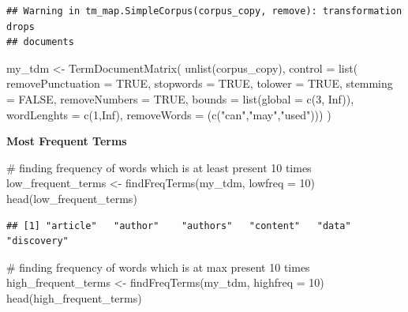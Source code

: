 \documentclass[
]{article}
\newenvironment{Shaded}{}{}
\newcommand{\AttributeTok}[1]{#1}
\newcommand{\CommentTok}[1]{\textcolor[rgb]{0.30,0.53,0.42}{#1}}
\newcommand{\ConstantTok}[1]{\textcolor[rgb]{0.35,0.36,0.96}{#1}}
\newcommand{\DecValTok}[1]{\textcolor[rgb]{0.00,0.00,0.80}{#1}}
\newcommand{\FunctionTok}[1]{#1}
\newcommand{\NormalTok}[1]{#1}
\newcommand{\OtherTok}[1]{\textcolor[rgb]{1.00,0.25,0.00}{#1}}
\newcommand{\StringTok}[1]{\textcolor[rgb]{0.01,0.42,0.03}{#1}}
\begin{document}
\begin{verbatim}
## Warning in tm_map.SimpleCorpus(corpus_copy, remove): transformation drops
## documents
\end{verbatim}

\begin{Shaded}
\begin{Highlighting}[]
\NormalTok{my\_tdm }\OtherTok{\textless{}{-}} \FunctionTok{TermDocumentMatrix}\NormalTok{(}
  \FunctionTok{unlist}\NormalTok{(corpus\_copy),}
  \AttributeTok{control =}
    \FunctionTok{list}\NormalTok{(}
      \AttributeTok{removePunctuation =} \ConstantTok{TRUE}\NormalTok{,}
      \AttributeTok{stopwords =} \ConstantTok{TRUE}\NormalTok{,}
      \AttributeTok{tolower =} \ConstantTok{TRUE}\NormalTok{,}
      \AttributeTok{stemming =} \ConstantTok{FALSE}\NormalTok{,}
      \AttributeTok{removeNumbers =} \ConstantTok{TRUE}\NormalTok{,}
      \AttributeTok{bounds =} \FunctionTok{list}\NormalTok{(}\AttributeTok{global =} \FunctionTok{c}\NormalTok{(}\DecValTok{3}\NormalTok{, }\ConstantTok{Inf}\NormalTok{)),}
      \AttributeTok{wordLenghts =} \FunctionTok{c}\NormalTok{(}\DecValTok{1}\NormalTok{,}\ConstantTok{Inf}\NormalTok{),}
      \AttributeTok{removeWords =}\NormalTok{ (}\FunctionTok{c}\NormalTok{(}\StringTok{"can"}\NormalTok{,}\StringTok{"may"}\NormalTok{,}\StringTok{"used"}\NormalTok{)))}
\NormalTok{)}
\end{Highlighting}
\end{Shaded}

\textbf{Most Frequent Terms}

\begin{Shaded}
\begin{Highlighting}[]
\CommentTok{\# finding frequency of words which is at least present 10 times}
\NormalTok{low\_frequent\_terms }\OtherTok{\textless{}{-}} \FunctionTok{findFreqTerms}\NormalTok{(my\_tdm, }\AttributeTok{lowfreq =} \DecValTok{10}\NormalTok{)}
\FunctionTok{head}\NormalTok{(low\_frequent\_terms)}
\end{Highlighting}
\end{Shaded}

\begin{verbatim}
## [1] "article"   "author"    "authors"   "content"   "data"      "discovery"
\end{verbatim}

\begin{Shaded}
\begin{Highlighting}[]
\CommentTok{\# finding frequency of words which is at max present 10 times}
\NormalTok{high\_frequent\_terms }\OtherTok{\textless{}{-}} \FunctionTok{findFreqTerms}\NormalTok{(my\_tdm, }\AttributeTok{highfreq =} \DecValTok{10}\NormalTok{)}
\FunctionTok{head}\NormalTok{(high\_frequent\_terms)}
\end{Highlighting}
\end{Shaded}
\end{document}
